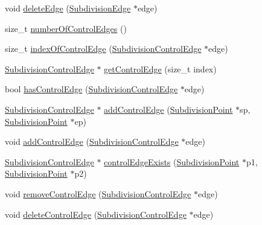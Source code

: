 \begin{DoxyCompactItemize}
\item 
void \hyperlink{classShipCAD_1_1SubdivisionSurface_abb5beb9a6fc413e8d713e18fb39bf2ba}{delete\-Edge} (\hyperlink{classShipCAD_1_1SubdivisionEdge}{Subdivision\-Edge} $\ast$edge)
\item 
size\-\_\-t \hyperlink{classShipCAD_1_1SubdivisionSurface_a2fd710a2e2fa0272b8c8f498b8fc4f56}{number\-Of\-Control\-Edges} ()
\item 
size\-\_\-t \hyperlink{classShipCAD_1_1SubdivisionSurface_ae2f4e931f0134f8637e0aa769dba1d32}{index\-Of\-Control\-Edge} (\hyperlink{classShipCAD_1_1SubdivisionControlEdge}{Subdivision\-Control\-Edge} $\ast$edge)
\item 
\hyperlink{classShipCAD_1_1SubdivisionControlEdge}{Subdivision\-Control\-Edge} $\ast$ \hyperlink{classShipCAD_1_1SubdivisionSurface_ac7d6762dc83f1f114c1d7f4e67d8f8eb}{get\-Control\-Edge} (size\-\_\-t index)
\item 
bool \hyperlink{classShipCAD_1_1SubdivisionSurface_a9856bef9e5b2de9be4a3118fa80d0f16}{has\-Control\-Edge} (\hyperlink{classShipCAD_1_1SubdivisionControlEdge}{Subdivision\-Control\-Edge} $\ast$edge)
\item 
\hyperlink{classShipCAD_1_1SubdivisionControlEdge}{Subdivision\-Control\-Edge} $\ast$ \hyperlink{classShipCAD_1_1SubdivisionSurface_a976358235d20a0fdc83248948bb9cf48}{add\-Control\-Edge} (\hyperlink{classShipCAD_1_1SubdivisionPoint}{Subdivision\-Point} $\ast$sp, \hyperlink{classShipCAD_1_1SubdivisionPoint}{Subdivision\-Point} $\ast$ep)
\item 
void \hyperlink{classShipCAD_1_1SubdivisionSurface_acfec50abf57a44ed47038ecc55f5a600}{add\-Control\-Edge} (\hyperlink{classShipCAD_1_1SubdivisionControlEdge}{Subdivision\-Control\-Edge} $\ast$edge)
\item 
\hyperlink{classShipCAD_1_1SubdivisionControlEdge}{Subdivision\-Control\-Edge} $\ast$ \hyperlink{classShipCAD_1_1SubdivisionSurface_a6a89be4440e3adfcb0b14c164db891ae}{control\-Edge\-Exists} (\hyperlink{classShipCAD_1_1SubdivisionPoint}{Subdivision\-Point} $\ast$p1, \hyperlink{classShipCAD_1_1SubdivisionPoint}{Subdivision\-Point} $\ast$p2)
\item 
void \hyperlink{classShipCAD_1_1SubdivisionSurface_a3aac4d6c8ad638234f88fb8b1ffa00cb}{remove\-Control\-Edge} (\hyperlink{classShipCAD_1_1SubdivisionControlEdge}{Subdivision\-Control\-Edge} $\ast$edge)
\item 
void \hyperlink{classShipCAD_1_1SubdivisionSurface_ae45fc2694977c8fbae54ac2e0e067d1f}{delete\-Control\-Edge} (\hyperlink{classShipCAD_1_1SubdivisionControlEdge}{Subdivision\-Control\-Edge} $\ast$edge)

\end{DoxyCompactItemize}
